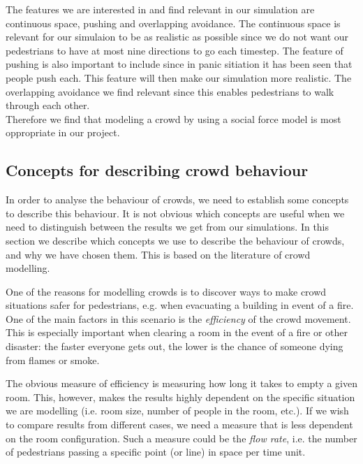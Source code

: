 The features we are interested in and find relevant in our simulation are continuous space, pushing and overlapping avoidance. The continuous space is
relevant for our simulaion to be as realistic as possible since we do not want our pedestrians to have at most nine directions to go each timestep.
The feature of pushing is also important to include since in panic sitiation it has been seen that people push each. This feature will then make our
simulation more realistic.
The overlapping avoidance we find relevant since this enables pedestrians to walk through each other.
\\
Therefore we find that modeling a crowd by using a social force model is most oppropriate in our project. 


\subsection{Concepts for describing crowd behaviour}
In order to analyse the behaviour of crowds, we need to establish some 
concepts to describe this behaviour. It is not obvious which concepts  are 
useful when we need to distinguish between the results we get from our 
simulations. In this section we describe which concepts we use to describe the 
behaviour of crowds, and why we have chosen them. This is based on the 
literature of crowd modelling.

One of the reasons for modelling crowds is to discover ways to make crowd 
situations safer for pedestrians, e.g. when evacuating a building in event of 
a fire. One of the main factors in this scenario is the \emph{efficiency} of 
the crowd movement. This is especially important when clearing a room in the 
event of a fire or other disaster: the faster everyone gets out, the lower is 
the chance of someone dying from flames or smoke.

The obvious measure of efficiency is measuring how long it takes to empty a 
given room. This, however, makes the results highly dependent on the specific 
situation we are modelling (i.e. room size, number of people in the room, 
etc.). If we wish to compare results from different cases, we need a measure 
that is less dependent on the room configuration. Such a measure could be the 
\emph{flow rate}, i.e. the number of pedestrians passing a specific point (or 
line) in space per time unit.


